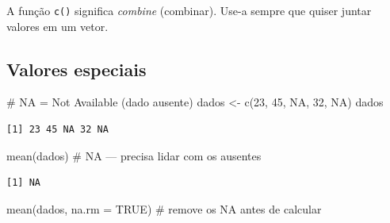 \documentclass[
  letterpaper,
]{scrbook}
\newenvironment{Shaded}{\begin{snugshade}}{\end{snugshade}}
\newcommand{\AttributeTok}[1]{\textcolor[rgb]{0.40,0.45,0.13}{#1}}
\newcommand{\CommentTok}[1]{\textcolor[rgb]{0.37,0.37,0.37}{#1}}
\newcommand{\ConstantTok}[1]{\textcolor[rgb]{0.56,0.35,0.01}{#1}}
\newcommand{\DecValTok}[1]{\textcolor[rgb]{0.68,0.00,0.00}{#1}}
\newcommand{\FunctionTok}[1]{\textcolor[rgb]{0.28,0.35,0.67}{#1}}
\newcommand{\NormalTok}[1]{\textcolor[rgb]{0.00,0.23,0.31}{#1}}
\newcommand{\OtherTok}[1]{\textcolor[rgb]{0.00,0.23,0.31}{#1}}
\begin{document}
\begin{tcolorbox}[enhanced jigsaw, arc=.35mm, bottomrule=.15mm, bottomtitle=1mm, breakable, colback=white, colbacktitle=quarto-callout-tip-color!10!white, colframe=quarto-callout-tip-color-frame, coltitle=black, left=2mm, leftrule=.75mm, opacityback=0, opacitybacktitle=0.6, rightrule=.15mm, title=\textcolor{quarto-callout-tip-color}{\faLightbulb}\hspace{0.5em}{Use \texttt{c()} para criar vetores}, titlerule=0mm, toprule=.15mm, toptitle=1mm]

A função \texttt{c()} significa \emph{combine} (combinar). Use-a sempre
que quiser juntar valores em um vetor.

\end{tcolorbox}

\subsection{Valores especiais}\label{valores-especiais}

\begin{Shaded}
\begin{Highlighting}[]
\CommentTok{\# NA = Not Available (dado ausente)}
\NormalTok{dados }\OtherTok{\textless{}{-}} \FunctionTok{c}\NormalTok{(}\DecValTok{23}\NormalTok{, }\DecValTok{45}\NormalTok{, }\ConstantTok{NA}\NormalTok{, }\DecValTok{32}\NormalTok{, }\ConstantTok{NA}\NormalTok{)}
\NormalTok{dados}
\end{Highlighting}
\end{Shaded}

\begin{verbatim}
[1] 23 45 NA 32 NA
\end{verbatim}

\begin{Shaded}
\begin{Highlighting}[]
\FunctionTok{mean}\NormalTok{(dados)             }\CommentTok{\# NA — precisa lidar com os ausentes}
\end{Highlighting}
\end{Shaded}

\begin{verbatim}
[1] NA
\end{verbatim}

\begin{Shaded}
\begin{Highlighting}[]
\FunctionTok{mean}\NormalTok{(dados, }\AttributeTok{na.rm =} \ConstantTok{TRUE}\NormalTok{)  }\CommentTok{\# remove os NA antes de calcular}
\end{Highlighting}
\end{Shaded}
\end{document}
